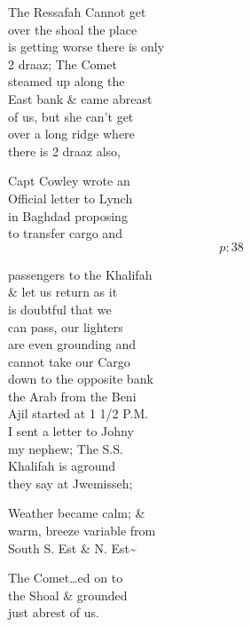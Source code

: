 \documentclass{report}
\begin{document}
	\par{
 	The Ressafah Cannot get\ \\over the shoal the place\ \\is getting worse there is only\ \\2 draaz; The Comet\ \\steamed up along the\ \\East bank \& came abreast\ \\of us, but she can't get\ \\over a long ridge where\ \\there is 2 draaz also,\ \\
	}

	\par{
 	Capt Cowley wrote an\ \\Official letter to Lynch\ \\in Baghdad proposing\ \\to transfer cargo and\ \\
  \[p: 38 \]

	}

	\par{
 	passengers to the Khalifah\ \\\& let us return as it\ \\is doubtful that we\ \\can pass, our lighters\ \\are even grounding and\ \\cannot take our Cargo\ \\down to the opposite bank\ \\the Arab from the Beni\ \\Ajil started at 1 1/2 P.M.\ \\I sent a letter to Johny\ \\my nephew; The S.S.\ \\Khalifah is aground\ \\they say at Jwemisseh;\ \\
	}

	\par{
 	Weather became calm; \&\ \\warm, breeze variable from\ \\South S. Est \& N. Est\~{}\ \\
	}

	\par{
 	The Comet…ed on to\ \\the Shoal \& grounded\ \\just abrest of us.\ \\
	}
\end{document}
